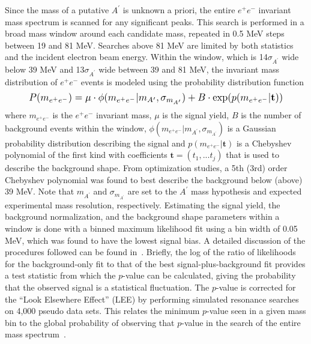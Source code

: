 \documentclass[twocolumn, showpacs, preprintnumbers,prd, superscriptaddress]{revtex4-1}
\newcommand{\pos}{e^{+}}
\newcommand{\ele}{e^{-}}
\newcommand{\epem}{\pos\ele}
\newcommand{\aprime}{A^\prime}
\begin{document}
        Since the mass of a putative $\aprime$ is unknown a priori, the entire 
        $\epem$ invariant mass spectrum is scanned for any significant peaks.
        This search is performed in a broad mass window around each candidate 
        mass, repeated in 0.5 MeV steps between 19 and 81 MeV.  Searches above
        81 MeV are limited by both statistics and the incident electron beam
        energy. Within the
        window, which is 14$\sigma_{\aprime}$ wide below 39 MeV and 13$\sigma_{\aprime}$ wide
        between 39 and 81 MeV, the invariant mass distribution of $\epem$ 
        events is modeled using the probability distribution function
        \begin{equation}
            \resizebox{.9\linewidth}{!}{
                $P(m_{\epem}) = 
                        \mu \cdot \phi(m_{\epem} | m_{\aprime}, \sigma_{m_{\aprime}}) 
                        + B\cdot \exp(p(m_{\epem} | \mathbf{t}))$
            }
        \end{equation}
        where $m_{\epem}$ is the $\epem$ invariant mass, $\mu$ is the signal 
        yield, $B$ is the number of background events within the window, 
        $\phi(m_{\epem} | m_{\aprime}, \sigma_{m_{\aprime}})$ is a Gaussian probability 
        distribution describing the signal and $p(m_{\epem} | \mathbf{t})$ is a 
        Chebyshev polynomial of the first kind with coefficients 
        $\mathbf{t} = (t_{1}, ... t_{j})$ that is used to describe the 
        background shape. From optimization studies,
        a 5th (3rd) order Chebyshev polynomial was found to best 
        describe the background below (above) 39 MeV. Note that $m_{\aprime}$ 
        and $\sigma_{m_{\aprime}}$ are set 
        to the $\aprime$ mass hypothesis and expected experimental mass 
        resolution, respectively. Estimating the signal yield, the background
        normalization, and the background shape parameters within a window 
        is done with a binned maximum likelihood fit using a bin width of 0.05 MeV,
        which was found to have the lowest signal bias. A detailed discussion 
        of the procedures followed can be found in~\cite{Cowan:2010js}. Briefly,
        the log of the ratio of likelihoods for the background-only fit to that 
        of the best signal-plus-background fit provides a test statistic from 
        which the $p$-value can be calculated, giving the probability that the 
        observed signal is a statistical fluctuation.  The $p$-value is corrected 
        for the ``Look Elsewhere Effect'' (LEE) by performing simulated resonance 
        searches on 4,000 pseudo data sets. This relates the minimum $p$-value 
        seen in a given mass bin to the global probability of observing that 
        $p$-value in the search of the entire mass spectrum~\cite{Gross:2010qma}. 
    
\end{document}
